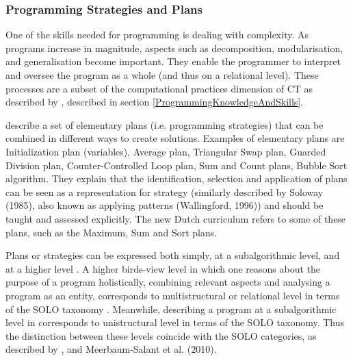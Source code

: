 %


\subsubsection{Programming Strategies and Plans}\label{sec:plans}

One of the skills needed for programming is dealing with complexity. As programs increase in magnitude, aspects such as decomposition, modularisation, and generalisation become important. They enable the programmer to interpret and oversee the program as a whole (and thus on a relational level). These processes are a subset of the computational practices dimension of CT as described by , described in section \ref{ProgrammingKnowledgeAndSkills}.


 describe a set of elementary plans (i.e. programming strategies) that can be combined in different ways to create solutions. Examples of elementary plans are Initialization plan (variables), Average plan, Triangular Swap plan, Guarded Division plan, Counter-Controlled Loop plan, Sum and Count plans, Bubble Sort algorithm. They explain that the identification, selection and application of plans can be seen as a representation for strategy (similarly described by Soloway (1985), also known as applying patterns (Wallingford, 1996)) and should be taught and assessed explicitly. The new Dutch curriculum \cite{Barendsen2016} refers to some of these plans, such as the Maximum, Sum and Sort plans.

Plans or strategies can be expressed both simply, at a subalgorithmic level, and at a higher level \cite{deRaadt2006}. A higher birds-view level in which one reasons about the purpose of a program holistically, combining relevant aspects and analysing a program as an entity, corresponds to multistructural or relational level in terms of the SOLO taxonomy \cite{Smetsers2017}. Meanwhile, describing a program at a subalgorithmic level in corresponds to unistructural level in terms of the SOLO taxonomy. Thus the distinction between these levels coincide with the SOLO categories, as described by ,  and Meerbaum-Salant et al. (2010).

